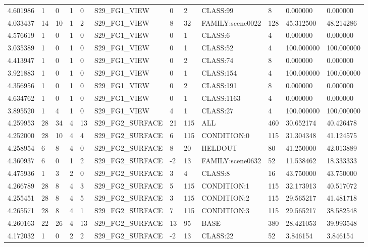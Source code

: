 \begin{tabular}{llllllllllll}
4.601986 & 1 & 0 & 1 & 0 & S29\_FG1\_VIEW & 0 & 2 & CLASS:99 & 8 & 0.000000 & 0.000000 \\
4.033437 & 14 & 10 & 1 & 2 & S29\_FG1\_VIEW & 8 & 32 & FAMILY:scene0022 & 128 & 45.312500 & 48.214286 \\
4.576619 & 1 & 0 & 1 & 0 & S29\_FG1\_VIEW & 0 & 1 & CLASS:6 & 4 & 0.000000 & 0.000000 \\
3.035389 & 1 & 0 & 1 & 0 & S29\_FG1\_VIEW & 0 & 1 & CLASS:52 & 4 & 100.000000 & 100.000000 \\
4.413947 & 1 & 0 & 1 & 0 & S29\_FG1\_VIEW & 0 & 2 & CLASS:74 & 8 & 0.000000 & 0.000000 \\
3.921883 & 1 & 0 & 1 & 0 & S29\_FG1\_VIEW & 0 & 1 & CLASS:154 & 4 & 100.000000 & 100.000000 \\
4.356956 & 1 & 0 & 1 & 0 & S29\_FG1\_VIEW & 0 & 2 & CLASS:191 & 8 & 0.000000 & 0.000000 \\
4.634762 & 1 & 0 & 1 & 0 & S29\_FG1\_VIEW & 0 & 1 & CLASS:1163 & 4 & 0.000000 & 0.000000 \\
3.895520 & 1 & 4 & 1 & 0 & S29\_FG1\_VIEW & 4 & 1 & CLASS:27 & 4 & 100.000000 & 100.000000 \\
4.259953 & 28 & 34 & 4 & 13 & S29\_FG2\_SURFACE & 21 & 115 & ALL & 460 & 30.652174 & 40.426478 \\
4.252000 & 28 & 10 & 4 & 4 & S29\_FG2\_SURFACE & 6 & 115 & CONDITION:0 & 115 & 31.304348 & 41.124575 \\
4.258954 & 6 & 8 & 4 & 0 & S29\_FG2\_SURFACE & 8 & 20 & HELDOUT & 80 & 41.250000 & 42.013889 \\
4.360937 & 6 & 0 & 1 & 2 & S29\_FG2\_SURFACE & -2 & 13 & FAMILY:scene0632 & 52 & 11.538462 & 18.333333 \\
4.475936 & 1 & 3 & 2 & 0 & S29\_FG2\_SURFACE & 3 & 4 & CLASS:8 & 16 & 43.750000 & 43.750000 \\
4.266789 & 28 & 8 & 4 & 3 & S29\_FG2\_SURFACE & 5 & 115 & CONDITION:1 & 115 & 32.173913 & 40.517072 \\
4.255451 & 28 & 8 & 4 & 5 & S29\_FG2\_SURFACE & 3 & 115 & CONDITION:2 & 115 & 29.565217 & 41.481718 \\
4.265571 & 28 & 8 & 4 & 1 & S29\_FG2\_SURFACE & 7 & 115 & CONDITION:3 & 115 & 29.565217 & 38.582548 \\
4.260163 & 22 & 26 & 4 & 13 & S29\_FG2\_SURFACE & 13 & 95 & BASE & 380 & 28.421053 & 39.993548 \\
4.172032 & 1 & 0 & 2 & 2 & S29\_FG2\_SURFACE & -2 & 13 & CLASS:22 & 52 & 3.846154 & 3.846154 \\

\end{tabular}
